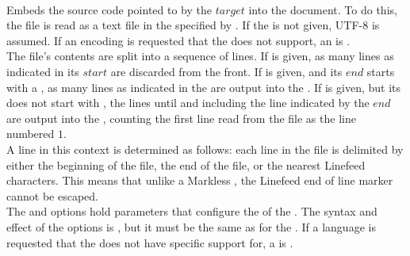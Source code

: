  \\

Embeds the source code pointed to by the \inline$target$ into the document. To do this, the file is read as a text file in the  specified by . If the  is not given, UTF-8  is assumed. If an encoding is requested that the  does not support, an  is .\\

The file's contents are split into a sequence of lines. If  is given, as many lines as indicated in its \inline$start$  are discarded from the front. If  is given, and its \inline$end$  starts with a , as many lines as indicated in the  are output into the . If  is given, but its  does not start with , the lines until and including the line indicated by the \inline$end$  are output into the , counting the first line read from the file as the line numbered \inline$1$. \\

A line in this context is determined as follows: each line in the file is delimited by either the beginning of the file, the end of the file, or the nearest Linefeed  characters. This means that unlike a Markless , the Linefeed  end of line marker cannot be escaped. \\

The  and  options hold parameters that configure the  of the . The syntax and effect of the options is , but it must be the same as for the  . If a language is requested that the  does not have specific support for, a  is . \\

